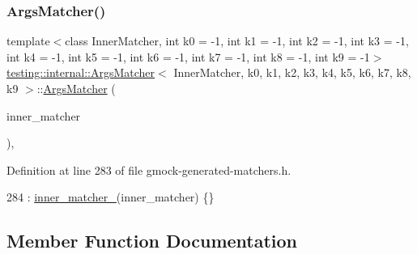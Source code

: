 \subsubsection{\texorpdfstring{Args\+Matcher()}{ArgsMatcher()}}
{\footnotesize\ttfamily template$<$class Inner\+Matcher, int k0 = -\/1, int k1 = -\/1, int k2 = -\/1, int k3 = -\/1, int k4 = -\/1, int k5 = -\/1, int k6 = -\/1, int k7 = -\/1, int k8 = -\/1, int k9 = -\/1$>$ \\
\hyperlink{classtesting_1_1internal_1_1ArgsMatcher}{testing\+::internal\+::\+Args\+Matcher}$<$ Inner\+Matcher, k0, k1, k2, k3, k4, k5, k6, k7, k8, k9 $>$\+::\hyperlink{classtesting_1_1internal_1_1ArgsMatcher}{Args\+Matcher} (\begin{DoxyParamCaption}\item[{const Inner\+Matcher \&}]{inner\+\_\+matcher }\end{DoxyParamCaption})\hspace{0.3cm}{\ttfamily [inline]}, {\ttfamily [explicit]}}



Definition at line 283 of file gmock-\/generated-\/matchers.\+h.


\begin{DoxyCode}
284       : \hyperlink{classtesting_1_1internal_1_1ArgsMatcher_ac76e55e4b52e18fa0c57aad4814a8a70}{inner\_matcher\_}(inner\_matcher) \{\}
\end{DoxyCode}


\subsection{Member Function Documentation}
\mbox{\label{classtesting_1_1internal_1_1ArgsMatcher_aa928e2846eafb7ddcda795d7c3dd526c}} 
